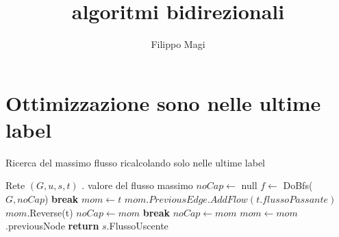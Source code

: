 \documentclass{article}
\title{algoritmi bidirezionali}
\author{Filippo Magi }
\begin{document}
\maketitle

\section{Ottimizzazione sono nelle ultime label}
\begin{algorithm}
    \caption{Ricerca del massimo flusso ricalcolando solo nelle ultime label}
    \begin{algorithmic}
        \REQUIRE Rete $(G,u,s,t)$ .
        \ENSURE valore del flusso massimo
        \STATE $noCap \leftarrow$ null
        \STATE $f \leftarrow$ DoBfs($G,noCap$)
        \STATE \textbf{break}
        \ENDIF
        \STATE $mom \leftarrow t$
        \STATE $mom.PreviousEdge.AddFlow(t.flussoPassante)$
        \STATE $mom$.Reverse(t) 
        \STATE $noCap \leftarrow mom$
        \STATE \textbf{break}
        \ENDIF
        \STATE $noCap \leftarrow mom$
        \ENDIF
        \STATE $mom \leftarrow mom$.previousNode
        \ENDWHILE
        \ENDWHILE
        \STATE \textbf{return} $s$.FlussoUscente
    \end{algorithmic}
\end{algorithm}
\end{document}
